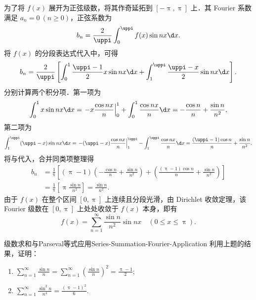 \begin{myproof}
    为了将 $f(x)$ 展开为正弦级数，将其作奇延拓到 $[-\uppi, \uppi]$ 上．其 Fourier 系数满足 $a_n = 0 \ (n \geqslant 0)$，正弦系数为
    \begin{equation}\label{eq:sine-bn-integral}
        b_n = \frac{2}{\uppi} \int_{0}^{\uppi} f(x) \sin nx \d x.
    \end{equation}
    将 $f(x)$ 的分段表达式代入中，可得
    \begin{equation}\label{eq:sine-bn-calc}
        b_n = \frac{2}{\uppi} \left[ \int_{0}^{1} \frac{\uppi-1}{2} x \sin nx \d x + \int_{1}^{\uppi} \frac{\uppi-x}{2} \sin nx \d x \right].
    \end{equation}
    分别计算两个积分项．第一项为
    \begin{equation}\label{eq:sine-part1}
        \int_{0}^{1} x \sin nx \d x = \left. -x \frac{\cos nx}{n} \right|_{0}^{1} + \int_{0}^{1} \frac{\cos nx}{n} \d x = -\frac{\cos n}{n} + \frac{\sin n}{n^2},
    \end{equation}
    第二项为
    \begin{equation}\label{eq:sine-part2}
        \int_{1}^{\uppi} (\uppi-x) \sin nx \d x = \left. -(\uppi-x) \frac{\cos nx}{n} \right|_{1}^{\uppi} - \int_{1}^{\uppi} \frac{\cos nx}{n} \d x = \frac{(\uppi-1)\cos n}{n} + \frac{\sin n}{n^2}.
    \end{equation}
    将与代入，合并同类项整理得
    \begin{equation}\label{eq:sine-bn-final}
        \begin{aligned}
            b_n & = \frac{1}{\uppi} \left[ (\uppi-1) \left( -\frac{\cos n}{n} + \frac{\sin n}{n^2} \right) + \left( \frac{(\uppi-1)\cos n}{n} + \frac{\sin n}{n^2} \right) \right] \\
                & = \frac{1}{\uppi} \left[ \uppi \frac{\sin n}{n^2} \right] = \frac{\sin n}{n^2}.
        \end{aligned}
    \end{equation}
    由于 $f(x)$ 在整个区间 $[0, \uppi]$ 上连续且分段光滑，由 Dirichlet 收敛定理，该 Fourier 级数在 $[0, \uppi]$ 上处处收敛于 $f(x)$ 本身，即有
    \begin{equation}\label{eq:final-identity}
        f(x) = \sum_{n=1}^{\infty} \frac{\sin n}{n^2} \sin nx \quad (0 \leqslant x \leqslant \uppi).
    \end{equation}
\end{myproof}

\begin{problem}{级数求和与Parseval等式应用}{Series-Summation-Fourier-Application}
    利用上题的结果，证明：
    \begin{enumerate}
        \item $\sum_{n=1}^{\infty} \frac{\sin n}{n} = \sum_{n=1}^{\infty} \left(\frac{\sin n}{n}\right)^2 = \frac{\uppi-1}{2}$;
        \item $\sum_{n=1}^{\infty} \frac{\sin^2 n}{n^4} = \frac{(\uppi-1)^2}{6}$.
    \end{enumerate}
\end{problem}


